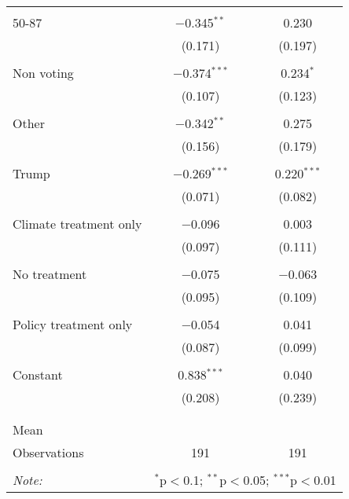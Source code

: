 \begin{tabular}{@{\extracolsep{5pt}}lcc}
  & & \\ 
 50-87 & $-$0.345$^{**}$ & 0.230 \\ 
  & (0.171) & (0.197) \\ 
  & & \\ 
 Non voting & $-$0.374$^{***}$ & 0.234$^{*}$ \\ 
  & (0.107) & (0.123) \\ 
  & & \\ 
 Other & $-$0.342$^{**}$ & 0.275 \\ 
  & (0.156) & (0.179) \\ 
  & & \\ 
 Trump & $-$0.269$^{***}$ & 0.220$^{***}$ \\ 
  & (0.071) & (0.082) \\ 
  & & \\ 
 Climate treatment only & $-$0.096 & 0.003 \\ 
  & (0.097) & (0.111) \\ 
  & & \\ 
 No treatment & $-$0.075 & $-$0.063 \\ 
  & (0.095) & (0.109) \\ 
  & & \\ 
 Policy treatment only & $-$0.054 & 0.041 \\ 
  & (0.087) & (0.099) \\ 
  & & \\ 
 Constant & 0.838$^{***}$ & 0.040 \\ 
  & (0.208) & (0.239) \\ 
  & & \\ 
\hline \\[-1.8ex] 
Mean &  &  \\ 
Observations & 191 & 191 \\ 
\hline 
\hline \\[-1.8ex] 
\textit{Note:}  & \multicolumn{2}{r}{$^{*}$p$<$0.1; $^{**}$p$<$0.05; $^{***}$p$<$0.01} \\ 
\end{tabular} 
